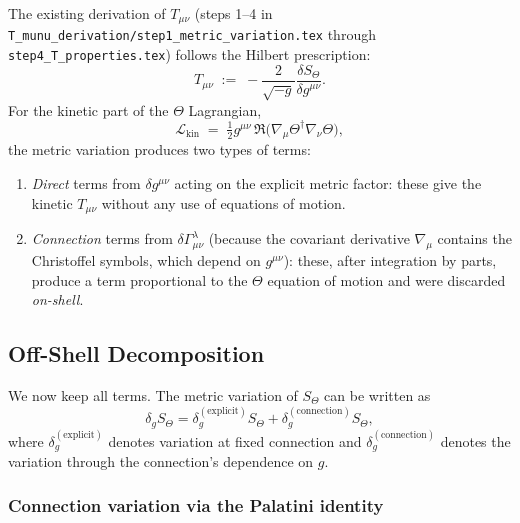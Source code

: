 \documentclass[12pt]{article}
\theoremstyle{definition}
\theoremstyle{remark}
\begin{document}
The existing derivation of $T_{\mu\nu}$ (steps 1--4 in
\texttt{T\_munu\_derivation/step1\_metric\_variation.tex} through \texttt{step4\_T\_properties.tex})
follows the Hilbert prescription:
\begin{equation}
  T_{\mu\nu} \;:=\; -\frac{2}{\sqrt{-g}}\frac{\delta S_\Theta}{\delta g^{\mu\nu}}.
  \label{eq:hilbert_Tmunu}
\end{equation}
For the kinetic part of the $\Theta$ Lagrangian,
\begin{equation}
  \mathcal{L}_{\text{kin}} \;=\; \tfrac{1}{2}g^{\mu\nu}\,\Re\!\bigl(\nabla_\mu\Theta^\dagger\nabla_\nu\Theta\bigr),
  \label{eq:L_kin}
\end{equation}
the metric variation produces two types of terms:
\begin{enumerate}
  \item \emph{Direct} terms from $\delta g^{\mu\nu}$ acting on the explicit metric factor:
        these give the kinetic $T_{\mu\nu}$ without any use of equations of motion.
  \item \emph{Connection} terms from $\delta\Gamma^\lambda_{\mu\nu}$ (because the
        covariant derivative $\nabla_\mu$ contains the Christoffel symbols, which
        depend on $g^{\mu\nu}$): these, after integration by parts, produce a term
        proportional to the $\Theta$ equation of motion and were discarded \emph{on-shell}.
\end{enumerate}

\subsection{Off-Shell Decomposition}

We now keep all terms. The metric variation of $S_\Theta$ can be written as
\begin{equation}
  \delta_g S_\Theta
  = \delta_g^{(\text{explicit})} S_\Theta
  + \delta_g^{(\text{connection})} S_\Theta,
  \label{eq:variation_split}
\end{equation}
where $\delta_g^{(\text{explicit})}$ denotes variation at fixed connection and
$\delta_g^{(\text{connection})}$ denotes the variation through the connection's
dependence on $g$.

\subsubsection{Connection variation via the Palatini identity}
\end{document}
